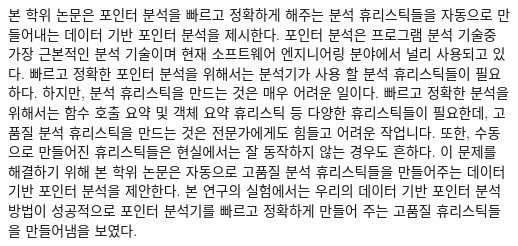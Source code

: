본 학위 논문은 포인터 분석을 빠르고 정확하게 해주는 분석 휴리스틱들을 자동으로 만들어내는 데이터 기반 포인터 분석을 제시한다. 포인터 분석은 프로그램 분석 기술중 가장 근본적인 분석 기술이며 현재 소프트웨어 엔지니어링 분야에서 널리 사용되고 있다. 빠르고 정확한 포인터 분석을 위해서는 분석기가 사용 할 분석 휴리스틱들이 필요하다. 하지만, 분석 휴리스틱을 만드는 것은 매우 어려운 일이다. 빠르고 정확한 분석을 위해서는 함수 호출 요약 및 객체 요약 휴리스틱 등 다양한 휴리스틱들이 필요한데, 고품질 분석 휴리스틱을 만드는 것은 전문가에게도 힘들고 어려운 작업니다. 또한, 수동으로 만들어진 휴리스틱들은 현실에서는 잘 동작하지 않는 경우도 흔하다. 이 문제를 해결하기 위해 본 학위 논문은 자동으로 고품질 분석 휴리스틱들을 만들어주는 데이터 기반 포인터 분석을 제안한다. 본 연구의 실험에서는 우리의 데이터 기반 포인터 분석 방법이 성공적으로 포인터 분석기를 빠르고 정확하게 만들어 주는 고품질 휴리스틱들을 만들어냄을 보였다.








